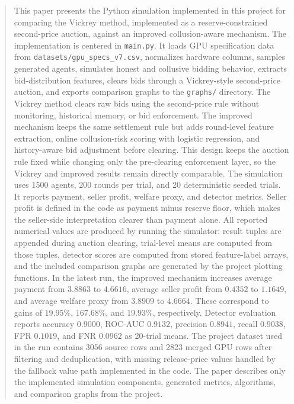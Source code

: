 \documentclass[conference]{IEEEtran}
\begin{document}
\begin{abstract}
This paper presents the Python simulation implemented in this project for comparing the Vickrey method, implemented as a reserve-constrained second-price auction, against an improved collusion-aware mechanism. The implementation is centered in \texttt{main.py}. It loads GPU specification data from \texttt{datasets/gpu\_specs\_v7.csv}, normalizes hardware columns, samples generated agents, simulates honest and collusive bidding behavior, extracts bid-distribution features, clears bids through a Vickrey-style second-price auction, and exports comparison graphs to the \texttt{graphs/} directory. The Vickrey method clears raw bids using the second-price rule without monitoring, historical memory, or bid enforcement. The improved mechanism keeps the same settlement rule but adds round-level feature extraction, online collusion-risk scoring with logistic regression, and history-aware bid adjustment before clearing. This design keeps the auction rule fixed while changing only the pre-clearing enforcement layer, so the Vickrey and improved results remain directly comparable. The simulation uses 1500 agents, 200 rounds per trial, and 20 deterministic seeded trials. It reports payment, seller profit, welfare proxy, and detector metrics. Seller profit is defined in the code as payment minus reserve floor, which makes the seller-side interpretation clearer than payment alone. All reported numerical values are produced by running the simulator: result tuples are appended during auction clearing, trial-level means are computed from those tuples, detector scores are computed from stored feature-label arrays, and the included comparison graphs are generated by the project plotting functions. In the latest run, the improved mechanism increases average payment from $3.8863$ to $4.6616$, average seller profit from $0.4352$ to $1.1649$, and average welfare proxy from $3.8909$ to $4.6664$. These correspond to gains of $19.95\%$, $167.68\%$, and $19.93\%$, respectively. Detector evaluation reports accuracy $0.9000$, ROC-AUC $0.9132$, precision $0.8941$, recall $0.9038$, FPR $0.1019$, and FNR $0.0962$ as 20-trial means. The project dataset used in the run contains 3056 source rows and 2823 merged GPU rows after filtering and deduplication, with missing release-price values handled by the fallback value path implemented in the code. The paper describes only the implemented simulation components, generated metrics, algorithms, and comparison graphs from the project.
\end{abstract}
\end{document}
